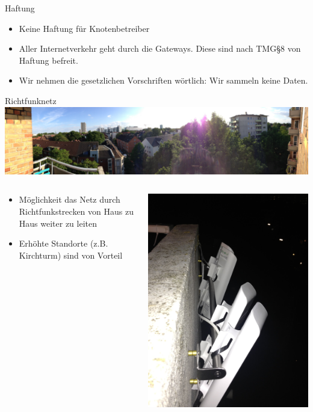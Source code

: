 \documentclass[t]{beamer}
\begin{document}
\begin{frame}{Haftung}
	\begin{itemize}
		\item Keine Haftung für Knotenbetreiber
		\item Aller Internetverkehr geht durch die Gateways. Diese sind nach TMG\S8 von Haftung befreit.
		\item Wir nehmen die gesetzlichen Vorschriften wörtlich: Wir sammeln keine Daten.
	\end{itemize}
\end{frame}


\begin{frame}{Richtfunknetz}
	\includegraphics[width=\textwidth]{Bilder/esmarch95}
	\begin{columns}
		\begin{column}{0.7\textwidth}
			\begin{itemize}
				\item Möglichkeit das Netz durch Richtfunkstrecken von Haus zu Haus weiter zu leiten
				\item Erhöhte Standorte (z.B. Kirchturm) sind von Vorteil
			\end{itemize}
		\end{column}
		\begin{column}{0.3\textwidth}
			\begin{center}
				\includegraphics[width=.8\textwidth]{Bilder/esmarch95-2}
			\end{center}
		\end{column}
	\end{columns}
	
\end{frame}
\end{document}

